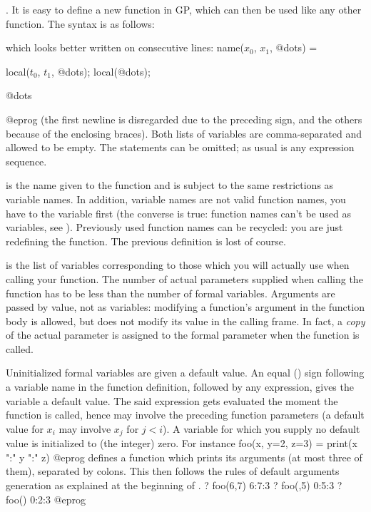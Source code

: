 .
It is easy to define a new function in GP, which can then be used like any
other function. The syntax is as follows:

\kbd{);} 

\noindent which looks better written on consecutive lines:
\bprogpart
name($x_0$, $x_1$, @dots) =
{
  local($t_0$, $t_1$, @dots);
  local(@dots);

  @dots
}
@eprog \noindent
(the first newline is disregarded due to the preceding \kbd{=} sign, and the
others because of the enclosing braces). Both lists of variables are
comma-separated and allowed to be empty. The  statements can be
omitted; as usual  is any expression sequence.

\noindent {} is the name given to the function and is subject to the
same restrictions as variable names. In addition, variable names are not
valid function names, you have to  the variable first (the converse
is true: function names can't be used as variables, see ).
Previously used function names can be recycled: you are just redefining the
function. The previous definition is lost of course.

\noindent {} is the list of variables
corresponding to those which you will actually use when calling your
function. The number of actual parameters supplied when calling the function
has to be less than the number of formal variables. Arguments are passed by
value, not as variables: modifying a function's argument in the function
body is allowed, but does not modify its value in the calling frame. In fact,
a \emph{copy} of the actual parameter is assigned to the formal parameter
when the function is called.

Uninitialized formal variables are given a default value. An equal (\kbd{=})
sign following a variable name in the function definition, followed by any
expression, gives the variable a default value. The said expression gets
evaluated the moment the function is called, hence may involve the preceding
function parameters (a default value for $x_i$ may involve $x_j$ for $j <
i$). A variable for which you supply no default value is initialized to 
(the integer) zero. For instance
\bprog
  foo(x, y=2, z=3) = print(x ":" y ":" z)
@eprog
\noindent defines a function which prints its arguments (at most three of
them), separated by colons. This then follows the rules of default
arguments generation as explained at the beginning of
.
\bprog
? foo(6,7)
6:7:3
? foo(,5)
0:5:3
? foo()
0:2:3
@eprog

